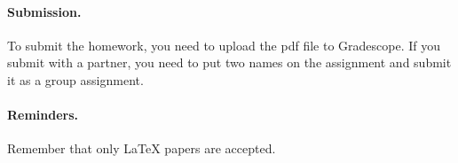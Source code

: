 \documentclass{article}
\begin{document}

\vskip 0.1in
\paragraph{Submission.}
To submit the homework, you need to upload the pdf file to Gradescope. If you submit with a partner, you need
to put two names on the assignment and submit it as a group assignment.

\paragraph{Reminders.}
Remember that only {\LaTeX} papers are accepted. 
\end{document}
